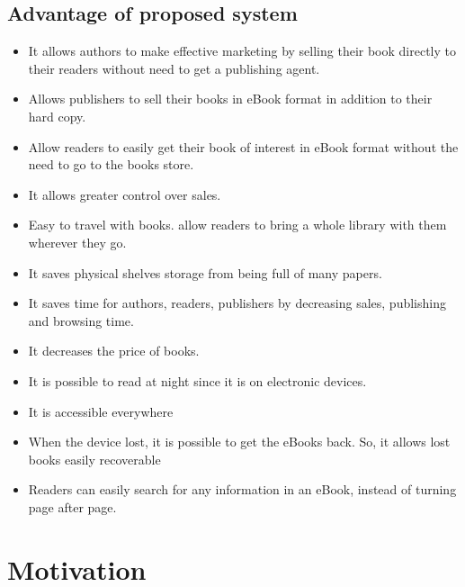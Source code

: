 		\subsection{Advantage of proposed system}

\begin{itemize}
	\item It allows authors to make effective marketing by selling their book directly to their readers without need to get a publishing agent.
	\item Allows publishers to sell their books in eBook format in addition to their hard copy.
	\item Allow readers to easily get their book of interest in eBook format without the need to go to the books store.
	\item It allows greater control over sales.
	\item Easy to travel with books. allow readers to bring a whole library with them wherever they go.
	\item It saves physical shelves storage from being full of many papers.
	\item It saves time for authors, readers, publishers by decreasing sales, publishing and browsing time.
	\item It decreases the price of books.
	\item It is possible to read at night since it is on electronic devices.
	\item It is accessible everywhere 
	\item When the device lost, it is possible to get the eBooks back. So, it allows lost books easily recoverable
	\item Readers can easily search for any information in an eBook, instead of turning page after page.
\end{itemize}

	\section{Motivation}

